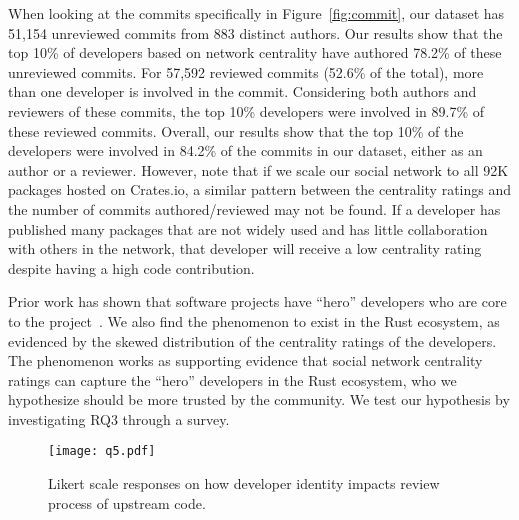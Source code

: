 \documentclass[10pt,journal,compsoc]{IEEEtran}
\begin{document}
When looking at the commits specifically in Figure~\ref{fig:commit}, our dataset has 51,154 unreviewed commits from 883 distinct authors. Our results show that the top 10\% of developers based on network centrality have authored 78.2\% of these unreviewed commits. For 57,592  reviewed commits (52.6\% of the total), more than one developer is involved in the commit. Considering both authors and reviewers of these commits,  the top 10\% developers were involved in 89.7\% of these reviewed commits.  Overall, our results show that the top 10\% of the developers were involved in 84.2\% of the commits in our dataset, either as an author or a reviewer. However, note that if we scale our social network to all 92K packages hosted on Crates.io, a similar pattern between the centrality ratings and the number of commits authored/reviewed may not be found. If a developer has published many packages that are not widely used and has little collaboration with others in the network, that developer will receive a low centrality rating despite having a high code contribution. 


Prior work has shown that software projects have ``hero'' developers who are core to the project~\cite{majumder2019software, agrawal2018we}. We also find the phenomenon to exist in the Rust ecosystem, as evidenced by the skewed distribution of the centrality ratings of the developers. The phenomenon works as supporting evidence that social network centrality ratings can capture the ``hero'' developers in the Rust ecosystem, who we hypothesize should be more trusted by the community. We test our hypothesis by investigating RQ3 through a survey.







\begin{figure*}
    \centering
    \texttt{[image: q5.pdf]}
    \caption{Likert scale responses on how developer identity impacts review process of upstream code.}
    \label{fig:q5}
\end{figure*}
\end{document}
